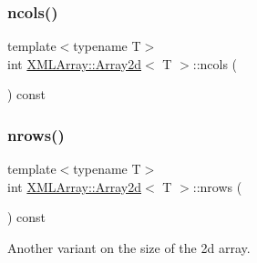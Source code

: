 \mbox{\label{classXMLArray_1_1Array2d_a9eecadb91fe97638a8d7adce77b0a562}} 
\subsubsection{\texorpdfstring{ncols()}{ncols()}\hspace{0.1cm}{\footnotesize\ttfamily [3/3]}}
{\footnotesize\ttfamily template$<$typename T$>$ \\
int \mbox{\hyperlink{classXMLArray_1_1Array2d}{X\+M\+L\+Array\+::\+Array2d}}$<$ T $>$\+::ncols (\begin{DoxyParamCaption}{ }\end{DoxyParamCaption}) const\hspace{0.3cm}{\ttfamily [inline]}}

\mbox{\label{classXMLArray_1_1Array2d_a05ca0ef1e6fdbafb2c7cc575f9c3081c}} 
\subsubsection{\texorpdfstring{nrows()}{nrows()}\hspace{0.1cm}{\footnotesize\ttfamily [1/3]}}
{\footnotesize\ttfamily template$<$typename T$>$ \\
int \mbox{\hyperlink{classXMLArray_1_1Array2d}{X\+M\+L\+Array\+::\+Array2d}}$<$ T $>$\+::nrows (\begin{DoxyParamCaption}{ }\end{DoxyParamCaption}) const\hspace{0.3cm}{\ttfamily [inline]}}



Another variant on the size of the 2d array. 

